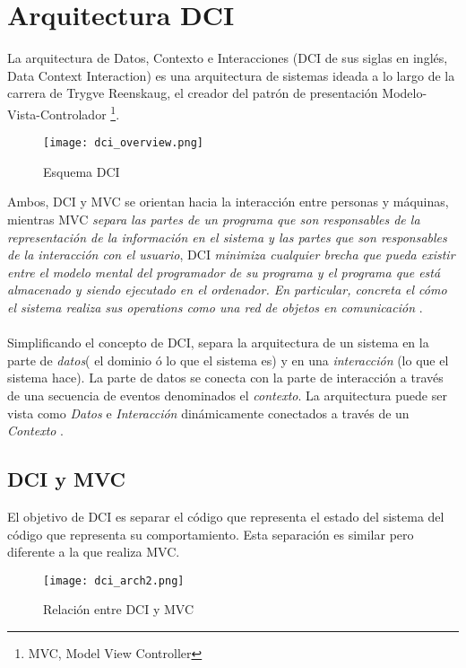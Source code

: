 \chapter{Arquitectura DCI}

  La arquitectura de Datos, Contexto e Interacciones (DCI de sus siglas
  en ingl\'es, Data Context Interaction) es una arquitectura de
  sistemas ideada a lo largo de la carrera de Trygve Reenskaug, el
  creador del patr\'on de presentaci\'on
  Modelo-Vista-Controlador \footnote{MVC, Model View Controller}.

\begin{figure}[!hbtp]
  \centerline{\texttt{[image: dci\_overview.png]}}
  \caption{Esquema DCI \citep{leanArchitecture} }
\end{figure}

  Ambos, DCI y MVC se orientan hacia la interacci\'on entre personas y
  m\'aquinas, mientras MVC \emph{separa las partes de un programa que
    son responsables de la representaci\'on de la informaci\'on en el
    sistema y las partes que son responsables de la interacci\'on con
    el usuario}, DCI \emph{minimiza cualquier brecha que pueda existir
    entre el modelo mental del programador de su programa y el
    programa que est\'a almacenado y siendo ejecutado en el
    ordenador. En particular, concreta el c\'omo el sistema realiza
    sus operations como una red de objetos en comunicaci\'on}
  \citep{leanArchitecture}.
\\
\\
  Simplificando el concepto de DCI, separa la arquitectura de un
  sistema en la parte de \emph{datos}( el dominio \'o lo que el
  sistema es) y en una \emph{interacci\'on} (lo que el sistema
  hace). La parte de datos se conecta con la parte de interacci\'on a
  trav\'es de una secuencia de eventos denominados el
  \emph{contexto}. La arquitectura puede ser vista como \emph{Datos} e
  \emph{Interacci\'on} din\'amicamente conectados a trav\'es de un
  \emph{Contexto} \citep{leanArchitecture}.

\section{DCI y MVC}
  El objetivo de DCI es separar el c\'odigo que representa el estado
  del sistema del c\'odigo que representa su comportamiento. Esta
  separaci\'on es similar pero diferente a la que realiza MVC.

\begin{figure}[!hbtp]
  \centerline{\texttt{[image: dci\_arch2.png]}}
  \caption{Relaci\'on entre DCI y MVC \citep{leanArchitecture}}
\end{figure}
 
